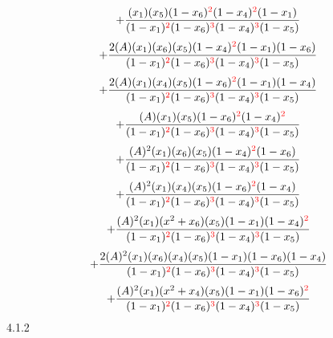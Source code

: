 \documentclass{article}
\begin{document}
\[+\frac{(x_1)(x_5)(1-x_6)^{\textcolor{red}{2}}(1-x_4)^{\textcolor{red}{2}}(1-x_1)}{(1-x_1)^{\textcolor{red}{2}}(1-x_6)^{\textcolor{red}{3}}(1-x_4)^{\textcolor{red}{3}}(1-x_5)}\]\[+\frac{2(A)(x_1)(x_6)(x_5)(1-x_4)^{\textcolor{red}{2}}(1-x_1)(1-x_6)}{(1-x_1)^{\textcolor{red}{2}}(1-x_6)^{\textcolor{red}{3}}(1-x_4)^{\textcolor{red}{3}}(1-x_5)}\]\[+\frac{2(A)(x_1)(x_4)(x_5)(1-x_6)^{\textcolor{red}{2}}(1-x_1)(1-x_4)}{(1-x_1)^{\textcolor{red}{2}}(1-x_6)^{\textcolor{red}{3}}(1-x_4)^{\textcolor{red}{3}}(1-x_5)}\]\[+\frac{(A)(x_1)(x_5)(1-x_6)^{\textcolor{red}{2}}(1-x_4)^{\textcolor{red}{2}}}{(1-x_1)^{\textcolor{red}{2}}(1-x_6)^{\textcolor{red}{3}}(1-x_4)^{\textcolor{red}{3}}(1-x_5)}\]\[+\frac{(A)^{2}(x_1)(x_6)(x_5)(1-x_4)^{\textcolor{red}{2}}(1-x_6)}{(1-x_1)^{\textcolor{red}{2}}(1-x_6)^{\textcolor{red}{3}}(1-x_4)^{\textcolor{red}{3}}(1-x_5)}\]\[+\frac{(A)^{2}(x_1)(x_4)(x_5)(1-x_6)^{\textcolor{red}{2}}(1-x_4)}{(1-x_1)^{\textcolor{red}{2}}(1-x_6)^{\textcolor{red}{3}}(1-x_4)^{\textcolor{red}{3}}(1-x_5)}\]\[+\frac{(A)^{2}(x_1)(x^{2}+x_6)(x_5)(1-x_1)(1-x_4)^{\textcolor{red}{2}}}{(1-x_1)^{\textcolor{red}{2}}(1-x_6)^{\textcolor{red}{3}}(1-x_4)^{\textcolor{red}{3}}(1-x_5)}\]\[+\frac{2(A)^{2}(x_1)(x_6)(x_4)(x_5)(1-x_1)(1-x_6)(1-x_4)}{(1-x_1)^{\textcolor{red}{2}}(1-x_6)^{\textcolor{red}{3}}(1-x_4)^{\textcolor{red}{3}}(1-x_5)}\]\[+\frac{(A)^{2}(x_1)(x^{2}+x_4)(x_5)(1-x_1)(1-x_6)^{\textcolor{red}{2}}}{(1-x_1)^{\textcolor{red}{2}}(1-x_6)^{\textcolor{red}{3}}(1-x_4)^{\textcolor{red}{3}}(1-x_5)}\]
4.1.2
\end{document}
